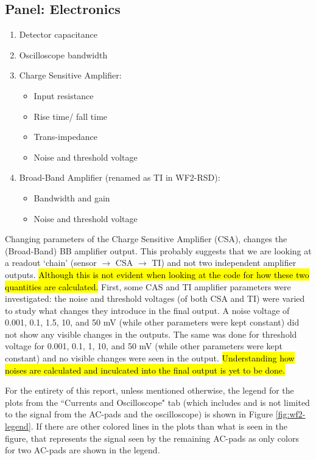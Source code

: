 \documentclass[11pt]{article}
\newcommand{\hlyellow}[1]{{\sethlcolor{yellow}\hl{#1}}}
\begin{document}
\subsection{Panel: Electronics}
\begin{enumerate}
    \item Detector capacitance
    \item Oscilloscope bandwidth
    \item Charge Sensitive Amplifier:
    \begin{itemize}
        \item Input resistance
        \item Rise time/ fall time
        \item Trans-impedance
        \item Noise and threshold voltage
    \end{itemize}
    \item Broad-Band Amplifier (renamed as TI in WF2-RSD):
    \begin{itemize}
        \item Bandwidth and gain
        \item Noise and threshold voltage
    \end{itemize}
\end{enumerate}
Changing parameters of the Charge Sensitive Amplifier (CSA), changes the (Broad-Band) BB amplifier output. This probably suggests that we are looking at a readout `chain' (sensor $\rightarrow$ CSA $\rightarrow$ TI) and not two independent amplifier outputs. \hlyellow{Although this is not evident when looking at the code for how these two quantities are calculated.}
\newline
First, some CAS and TI amplifier parameters were investigated: the noise and threshold voltages (of both CSA and TI) were varied to study what changes they introduce in the final output. A noise voltage of 0.001, 0.1, 1.5, 10, and 50 mV (while other parameters were kept constant) did not show any visible changes in the outputs. The same was done for threshold voltage for 0.001, 0.1, 1, 10, and 50 mV (while other parameters were kept constant) and no visible changes were seen in the output. \hlyellow{Understanding how noises are calculated and inculcated into the final output is yet to be done.}

For the entirety of this report, unless mentioned otherwise, the legend for the plots from the ``Currents and Oscilloscope" tab (which includes and is not limited to the signal from the AC-pads and the oscilloscope) is shown in Figure \ref{fig:wf2-legend}. If there are other colored lines in the plots than what is seen in the figure, that represents the signal seen by the remaining AC-pads as only colors for two AC-pads are shown in the legend.
\end{document}
